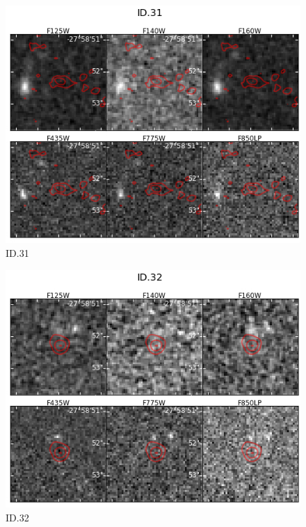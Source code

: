 \begin{figure}[tbp]
\centering \includegraphics[width=160mm]{Matched/ASPECS_Cutout_30.jpg}
\caption{ID.31}
\label{fig:Match_Three}
\end{figure}

\begin{figure}[tbp]
\centering \includegraphics[width=160mm]{Matched/ASPECS_Cutout_31.jpg}
\caption{ID.32}
\label{fig:Match_Three}
\end{figure}


